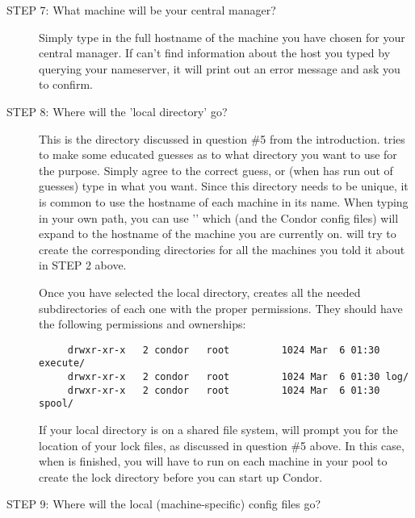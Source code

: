 \begin{description}

\item[STEP 7: What machine will be your central manager?]

     Simply type in the full hostname of the machine you have chosen
     for your central manager.  If  can't find
     information about the host you typed by querying your nameserver,
     it will print out an error message and ask you to confirm.


\item[STEP 8: Where will the 'local directory' go?]

     This is the directory discussed in question \#5 from the
     introduction.   tries to make some educated guesses
     as to what directory you want to use for the purpose.  Simply
     agree to the correct guess, or (when  has run out
     of guesses) type in what you want.  Since this directory needs to
     be unique, it is common to use the hostname of each machine in
     its name.  When typing in your own path, you can use
     '' which  (and the Condor config files)
     will expand to the hostname of the machine you are currently on.
      will try to create the corresponding directories
     for all the machines you told it about in STEP 2 above.

     Once you have selected the local directory, 
     creates all the needed subdirectories of each one with the proper
     permissions.  They should have the following permissions and
     ownerships:
\begin{verbatim}
     drwxr-xr-x   2 condor   root         1024 Mar  6 01:30 execute/
     drwxr-xr-x   2 condor   root         1024 Mar  6 01:30 log/
     drwxr-xr-x   2 condor   root         1024 Mar  6 01:30 spool/
\end{verbatim}

     If your local directory is on a shared file system,
      will prompt you for the location of your lock
     files, as discussed in question \#5 above.  In this case, when
      is finished, you will have to run  on
     each machine in your pool to create the lock directory before you
     can start up Condor.


\item[STEP 9: Where will the local (machine-specific) config files go?]


\end{description}
